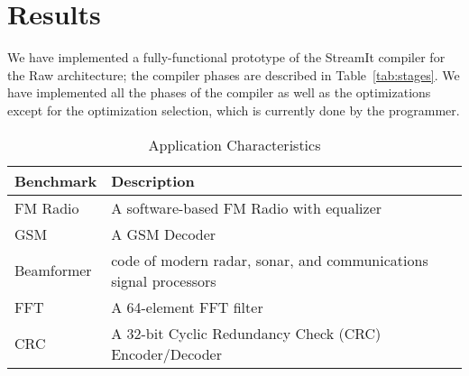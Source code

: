 \section{Results}
\label{sec:results}

We have implemented a fully-functional prototype of the StreamIt
compiler for the Raw architecture; the compiler phases are described
in Table~\ref{tab:stages}. We have implemented all the phases of the
compiler as well as the optimizations except for the optimization
selection, which is currently done by the programmer.

\begin{table}[t]
\begin{center}
\scriptsize
\begin{tabular}{|l|l|} \hline
Benchmark & Description\\
\hline \hline
FM Radio & A software-based FM Radio with equalizer\\
\hline
GSM & A GSM Decoder\\
\hline
Beamformer & code of modern radar, sonar, and communications signal processors \cite{pca}\\
\hline
FFT & A 64-element FFT filter \\
\hline
CRC & A 32-bit Cyclic Redundancy Check (CRC) Encoder/Decoder\\
\hline
\end{tabular}
\vspace{-6pt}
\caption{\protect\small Application Characteristics}
\label{tab:benchmarks}
\vspace{-12pt}
\end{center}
\end{table}



%
%
%


